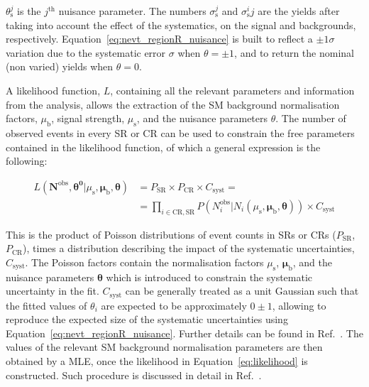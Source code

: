 			\noindent $\theta_\mathrm{s}^j$ is the $j^{\mathrm{th}}$ nuisance parameter. The numbers $\sigma_\mathrm{s}^j$ and $\sigma_\mathrm{s}^ij$ are the yields after taking into account the effect of the systematics, on the signal and backgrounds, respectively. Equation~\ref{eq:nevt_regionR_nuisance} is built to reflect a $\pm 1 \sigma$ variation due to the systematic error $\sigma$ when $\theta = \pm 1$, and to return the nominal (non varied) yields when $\theta = 0$. %

			A likelihood function, $L$, containing all the relevant parameters and information from the analysis, allows the extraction of the \ac{SM} background normalisation factors, $\mu_\mathrm{b}$, signal strength, $\mu_\mathrm{s}$, and the nuisance parameters $\theta$. The number of observed events in every \ac{SR} or \ac{CR} can be used to constrain the free parameters contained in the likelihood function, of which a general expression is the following:

			\begin{equation}
				\begin{split}
					L \left ( \bm{N}^{\mathrm{obs}}, \bm{\theta^0} | \mu_\mathrm{s}, \bm{\mu_{\mathrm{b}}, \theta} \right ) & = P_{\mathrm{SR}} \times P_{\mathrm{CR}} \times C_{\mathrm{syst}} = \\
					& = \prod_{i \in \mathrm{CR, SR}} P \left ( N_i^{\mathrm{obs}} | N_i \left( \mu_\mathrm{s}, \bm{\mu_{\mathrm{b}}, \theta} \right) \right ) \times C_{\mathrm{syst}}
				\end{split}
				\label{eq:likelihood}
			\end{equation}

			\noindent This is the product of Poisson distributions of event counts in \acp{SR} or \acp{CR} ($P_{\mathrm{SR}}$, $P_{\mathrm{CR}}$), times a distribution describing the impact of the systematic uncertainties, $C_{\mathrm{syst}}$. The Poisson factors contain the normalisation factors $\mu_\mathrm{s}$, $\bm{\mu_{\mathrm{b}}}$, and the nuisance parameters $\bm{\theta}$ which is introduced to constrain the systematic uncertainty in the fit. $C_{\mathrm{syst}}$ can be generally treated as a unit Gaussian such that the fitted values of $\theta_i$ are expected to be approximately $0\pm1$, allowing to reproduce the expected size of the systematic uncertainties using Equation~\ref{eq:nevt_regionR_nuisance}. Further details can be found in Ref.~\cite{histfitter}. The values of the relevant \ac{SM} background normalisation parameters are then obtained by a \ac{MLE}, once the likelihood in Equation~\ref{eq:likelihood} is constructed. Such procedure is discussed in detail in Ref.~\cite{cowan1998statistical}.

